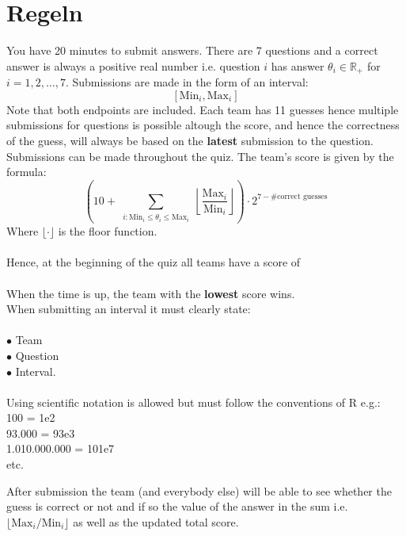 \documentclass[12pt,a4paper]{article}
\newcommand{\timemin}{20}
\newcommand{\nquestions}{7}
\newcommand{\nguesses}{11}
\begin{document}
 
\section*{Regeln}
You have \timemin{} minutes to submit answers. There are \nquestions{} questions and a correct answer is always a positive real number i.e. question $i$ has answer $\theta_i \in \mathbb{R}_+$ for $i = 1,2,\ldots, \nquestions{} $. Submissions are made in the form of an interval:
$$
[\text{Min}_i, \text{Max}_i]
$$
Note that both endpoints are included. Each team has \nguesses{} guesses hence multiple submissions for questions is possible altough the score, and hence the correctness of the guess, will always be based on the \textbf{latest} submission to the question.
Submissions can be made throughout the quiz. 
The team's score is given by the formula:
$$
\left( 10 + \sum_{\substack{i : \text{Min}_i \leq \theta_i \leq \text{Max}_i}} \left\lfloor \frac{\text{Max}_i}{\text{Min}_i} \right\rfloor \right) \cdot 2^{\nquestions{} - \# \text{correct guesses} }
$$
Where $\lfloor \cdot \rfloor$ is the floor function.\\ \\
Hence, at the beginning of the quiz all teams have a score of \\

\showcalculation[(10 + 0) * 2 ^ {\nquestions{}-0} ]{ 10 * 2 ^ \nquestions{}} \\


When the time is up, the team with the \textbf{lowest} score wins.\\
When submitting an interval it must clearly state:\\ \\
$\bullet$ Team\\
$\bullet$ Question\\
$\bullet$ Interval. \\ \\
Using scientific notation is allowed but must follow the conventions of R e.g.:\\
100 = 1e2 \\
93.000 = 93e3 \\
1.010.000.000 = 101e7 \\
etc.

After submission the team (and everybody else) will be able to see whether the guess is correct or not and if so the value of the answer in the sum i.e. $\lfloor \text{Max}_i / \text{Min}_i \rfloor$ as well as the updated total score.

\newpage
\end{document}
